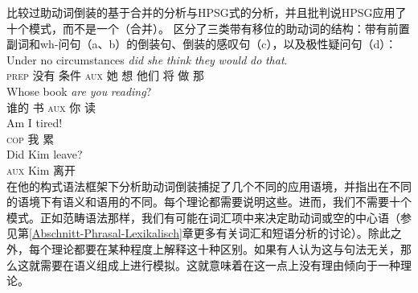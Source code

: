 \citet{Chomsky2010a}比较过助动词倒装的基于合并的分析与HPSG式的分析，并且批判说HPSG应用了十个模式，而不是一个（合并）。 \citet{GSag2000a-u}区分了三类带有移位的助动词的结构：带有前置副词和wh-问句（a、b）的倒装句、倒装的感叹句（c），以及极性疑问句（d）：
\eal
\ex 
\gll Under no circumstances \emph{did} \emph{she} \emph{think} \emph{they} \emph{would} \emph{do} \emph{that}.\\
     \textsc{prep} 没有 条件 \textsc{aux} 她 想 他们 将 做 那\\
\ex 
\gll Whose book \emph{are} \emph{you} \emph{reading}?\\
谁的 书 \textsc{aux} 你 读\\
\ex 
\gll Am I tired!\\
\textsc{cop} 我 累\\
\ex 
\gll Did Kim leave?\\
\textsc{aux} Kim 离开\\
\zl
 \citet{Fillmore99a}在他的构式语法\indexcxg 框架下分析助动词倒装捕捉了几个不同的应用语境，并指出在不同的语境下有语义和语用的不同。每个理论都需要说明这些。进而，我们不需要十个模式。正如范畴语法那样，我们有可能在词汇项中来决定助动词或空的中心语（参见第\ref{Abschnitt-Phrasal-Lexikalisch}章更多有关词汇和短语分析的讨论）。除此之外，每个理论都要在某种程度上解释这十种区别。如果有人认为这与句法无关，那么这就需要在语义组成上进行模拟。这就意味着在这一点上没有理由倾向于一种理论。


